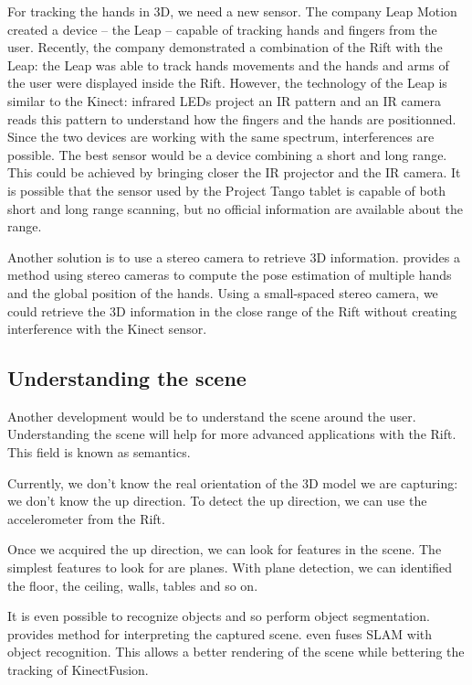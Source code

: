 \documentclass[12pt]{article}
\begin{document}
For tracking the hands in 3D, we need a new sensor. The company Leap Motion created a device -- the Leap -- capable of tracking hands and fingers from the user. Recently, the company demonstrated a combination of the Rift with the Leap: the Leap was able to track hands movements and the hands and arms of the user were displayed inside the Rift. However, the technology of the Leap is similar to the Kinect: infrared LEDs project an IR pattern and an IR camera reads this pattern to understand how the fingers and the hands are positionned. Since the two devices are working with the same spectrum, interferences are possible. The best sensor would be a device combining a short and long range. This could be achieved by bringing closer the IR projector and the IR camera. It is possible that the sensor used by the Project Tango tablet is capable of both short and long range scanning, but no official information are available about the range.

Another solution is to use a stereo camera to retrieve 3D information. \cite{HandStereo} provides a method using stereo cameras to compute the pose estimation of multiple hands and the global position of the hands. Using a small-spaced stereo camera, we could retrieve the 3D information in the close range of the Rift without creating interference with the Kinect sensor.

\subsection{Understanding the scene}
Another development would be to understand the scene around the user. Understanding the scene will help for more advanced applications with the Rift. This field is known as semantics.

Currently, we don't know the real orientation of the 3D model we are capturing: we don't know the up direction. To detect the up direction, we can use the accelerometer from the Rift.

Once we acquired the up direction, we can look for features in the scene. The simplest features to look for are planes. With plane detection, we can identified the floor, the ceiling, walls, tables and so on.

It is even possible to recognize objects and so perform object segmentation. \cite{PCLSeg, SegmetationMotion} provides method for interpreting the captured scene. \cite{SLAMObject} even fuses SLAM with object recognition. This allows a better rendering of the scene while bettering the tracking of KinectFusion.
\end{document}
